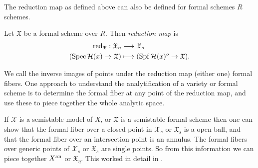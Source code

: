 The reduction map as defined above can also be defined for formal schemes $R$ schemes.  
\begin{definition}
	Let $\mathfrak{X} $ be a formal scheme over $R$. 
	Then \emph{reduction map} is 
	\begin{align*}
		\operatorname{red}_{\mathfrak X}:  \mathfrak{X} _\eta &\longrightarrow \mathfrak{X} _s \\
		(\operatorname{Spec} \mathcal H(x) \to \mathfrak X) &\longmapsto (\operatorname{Spf} \mathcal H(x)^o \to \mathfrak X)
	.\end{align*}
\end{definition}

We call the inverse images of points under the reduction map (either one) formal fibers. 
One approach to understand the analytification of a variety or formal scheme is to determine the formal fiber at any point of the reduction map, and use these to piece together the whole analytic space. 

If $\mathscr X$ is a semistable model of $X$, or $\mathfrak{X} $ is a semistable formal scheme then one can show that the formal fiber over a closed point in $\mathscr X_s$ or $\mathfrak{X} _s$ is a open ball, and that the formal fiber over an intersection point is an annulus. 
The formal fibers over generic points of $\mathscr X_s$ or $\mathfrak{X} _s$ are single points. 
So from this information we can piece together $X{}^{\text{an}}$ or  $\mathfrak{X} _\eta$. 
This worked in detail in \cite{bakerStructureNonarchimedeanAnalytic2013}.



